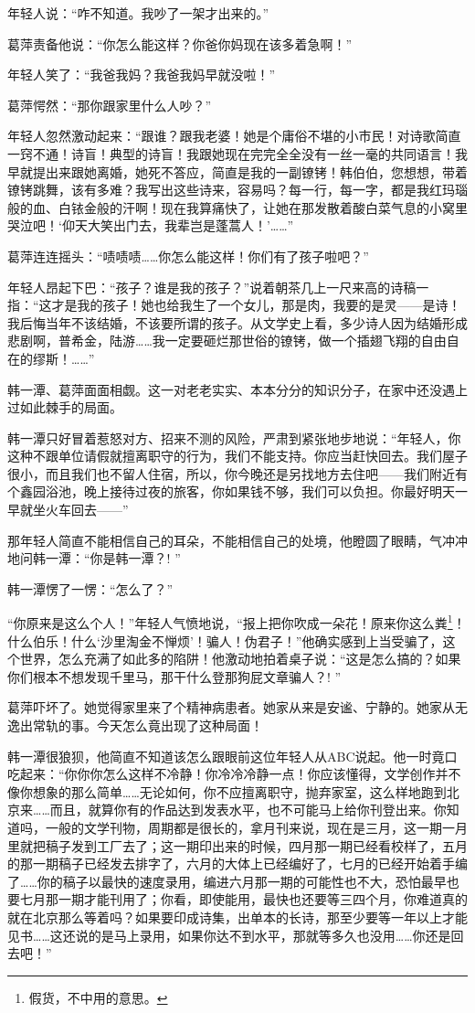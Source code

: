 \par 年轻人说：“咋不知道。我吵了一架才出来的。”
\par 葛萍责备他说：“你怎么能这样？你爸你妈现在该多着急啊！”
\par 年轻人笑了：“我爸我妈？我爸我妈早就没啦！”
\par 葛萍愕然：“那你跟家里什么人吵？”
\par 年轻人忽然激动起来：“跟谁？跟我老婆！她是个庸俗不堪的小市民！对诗歌简直一窍不通！诗盲！典型的诗盲！我跟她现在完完全全没有一丝一毫的共同语言！我早就提出来跟她离婚，她死不答应，简直是我的一副镣铐！韩伯伯，您想想，带着镣铐跳舞，该有多难？我写出这些诗来，容易吗？每一行，每一字，都是我红玛瑙般的血、白铱金般的汗啊！现在我算痛快了，让她在那发散着酸白菜气息的小窝里哭泣吧！‘仰天大笑出门去，我辈岂是蓬蒿人！'……”
\par 葛萍连连摇头：“啧啧啧……你怎么能这样！你们有了孩子啦吧？”
\par 年轻人昂起下巴：“孩子？谁是我的孩子？”说着朝茶几上一尺来高的诗稿一指：“这才是我的孩子！她也给我生了一个女儿，那是肉，我要的是灵——是诗！我后悔当年不该结婚，不该要所谓的孩子。从文学史上看，多少诗人因为结婚形成悲剧啊，普希金，陆游……我一定要砸烂那世俗的镣铐，做一个插翅飞翔的自由自在的缪斯！……”
\par 韩一潭、葛萍面面相觑。这一对老老实实、本本分分的知识分子，在家中还没遇上过如此棘手的局面。
\par 韩一潭只好冒着惹怒对方、招来不测的风险，严肃到紧张地步地说：“年轻人，你这种不跟单位请假就擅离职守的行为，我们不能支持。你应当赶快回去。我们屋子很小，而且我们也不留人住宿，所以，你今晚还是另找地方去住吧——我们附近有个鑫园浴池，晚上接待过夜的旅客，你如果钱不够，我们可以负担。你最好明天一早就坐火车回去——”
\par 那年轻人简直不能相信自己的耳朵，不能相信自己的处境，他瞪圆了眼睛，气冲冲地问韩一潭：“你是韩一潭？! ”
\par 韩一潭愣了一愣：“怎么了？”
\par “你原来是这么个人！”年轻人气愤地说，“报上把你吹成一朵花！原来你这么粪\footnote{假货，不中用的意思。}！什么伯乐！什么‘沙里淘金不惮烦’！骗人！伪君子！”他确实感到上当受骗了，这个世界，怎么充满了如此多的陷阱！他激动地拍着桌子说：“这是怎么搞的？如果你们根本不想发现千里马，那干什么登那狗屁文章骗人？! ”
\par 葛萍吓坏了。她觉得家里来了个精神病患者。她家从来是安谧、宁静的。她家从无逸出常轨的事。今天怎么竟出现了这种局面！
\par 韩一潭很狼狈，他简直不知道该怎么跟眼前这位年轻人从ABC说起。他一时竟口吃起来：“你你你怎么这样不冷静！你冷冷冷静一点！你应该懂得，文学创作并不像你想象的那么简单……无论如何，你不应擅离职守，抛弃家室，这么样地跑到北京来……而且，就算你有的作品达到发表水平，也不可能马上给你刊登出来。你知道吗，一般的文学刊物，周期都是很长的，拿月刊来说，现在是三月，这一期一月里就把稿子发到工厂去了；这一期印出来的时候，四月那一期已经看校样了，五月的那一期稿子已经发去排字了，六月的大体上已经编好了，七月的已经开始着手编了……你的稿子以最快的速度录用，编进六月那一期的可能性也不大，恐怕最早也要七月那一期才能刊用了；你看，即使能用，最快也还要等三四个月，你难道真的就在北京那么等着吗？如果要印成诗集，出单本的长诗，那至少要等一年以上才能见书……这还说的是马上录用，如果你达不到水平，那就等多久也没用……你还是回去吧！”
